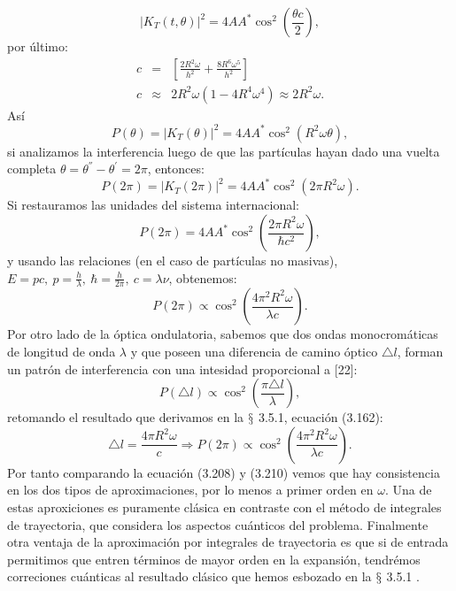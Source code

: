\begin{equation}
|K_{T}(t,\theta)|^{2}=4AA^{*}\cos^{2}\left(\frac{\theta c}{2}\right),
\end{equation}
por último:
\begin{eqnarray}
\nonumber c&=&\left[\frac{2R^{2}\omega}{h^{2}}+\frac{8R^{6}\omega^{5}}{h^{2}}\right]\\
\nonumber c&\approx &  2R^{2}\omega(1-4R^{4}\omega^{4})\approx2R^{2}\omega .
\end{eqnarray}
Así 
\begin{equation}
P(\theta)=|K_{T}(\theta)|^{2}=4AA^{*}\cos^{2}(R^{2}\omega\theta),
\end{equation}
si analizamos la interferencia luego de que las partículas hayan dado una vuelta completa $\theta=\theta^{''}-\theta^{'}=2\pi$, entonces:
\begin{equation}
P(2\pi)=|K_{T}(2\pi)|^{2}=4AA^{*}\cos^{2}(2\pi R^{2}\omega).
\end{equation}
Si restauramos las unidades del sistema internacional:
\begin{equation}
P(2\pi)=4AA^{*}\cos^{2}\left(\frac{2\pi R^{2}\omega}{\hbar c^{2}}\right),
\end{equation}
y usando las relaciones (en el caso de partículas no masivas), $E=pc,\ p=\frac{h}{\lambda},\ \hbar=\frac{h}{2\pi},\ c=\lambda \nu$, obtenemos:
\begin{equation}
P(2\pi)\propto\cos^{2}\left(\frac{4\pi^{2}R^{2}\omega}{\lambda c}\right).
\end{equation}
Por otro lado de la óptica ondulatoria, sabemos que dos ondas monocromáticas de longitud de onda $\lambda$ 	y que poseen una diferencia de camino óptico $\triangle l$, forman un patrón de interferencia con una intesidad proporcional a [22]:
\begin{equation}
P(\triangle l)\propto\cos^{2}\left(\frac{\pi\triangle l}{\lambda}\right),
\end{equation} 
retomando el resultado que derivamos en la $\mathsection$ 3.5.1, ecuación (3.162):
\begin{equation}
\triangle l=\frac{4\pi R^{2}\omega}{c}\Rightarrow P(2\pi)\propto\cos^{2}\left(\frac{4\pi^{2}R^{2}\omega}{\lambda c}\right).
\end{equation}
Por tanto comparando la ecuación (3.208) y (3.210) vemos que hay consistencia en los dos tipos de aproximaciones, por lo menos a primer orden en $\omega$. Una de estas aproxiciones es puramente clásica en contraste con el método de integrales de trayectoria, que considera los aspectos cuánticos del problema. Finalmente otra ventaja de la aproximación por integrales de trayectoria es que si de entrada permitimos que entren términos de mayor orden en la expansión, tendrémos correciones cuánticas al resultado clásico que hemos esbozado en la $\mathsection$ 3.5.1 . 
 




